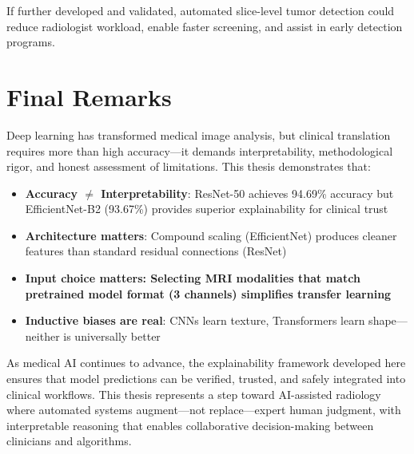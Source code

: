 If further developed and validated, automated slice-level tumor detection could reduce radiologist workload, enable faster screening, and assist in early detection programs.

\section{Final Remarks}

Deep learning has transformed medical image analysis, but clinical translation requires more than high accuracy---it demands interpretability, methodological rigor, and honest assessment of limitations. This thesis demonstrates that:

\begin{itemize}
    \item \textbf{Accuracy $\neq$ Interpretability}: ResNet-50 achieves 94.69\% accuracy but EfficientNet-B2 (93.67\%) provides superior explainability for clinical trust
    \item \textbf{Architecture matters}: Compound scaling (EfficientNet) produces cleaner features than standard residual connections (ResNet)
    \item \textbf{Input choice matters: Selecting MRI modalities that match pretrained model format (3 channels) simplifies transfer learning}
    \item \textbf{Inductive biases are real}: CNNs learn texture, Transformers learn shape---neither is universally better
\end{itemize}

As medical AI continues to advance, the explainability framework developed here ensures that model predictions can be verified, trusted, and safely integrated into clinical workflows. This thesis represents a step toward AI-assisted radiology where automated systems augment---not replace---expert human judgment, with interpretable reasoning that enables collaborative decision-making between clinicians and algorithms.

